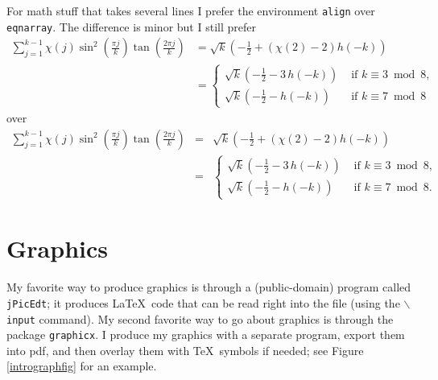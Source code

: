 \documentclass{article}
\begin{document}
{For math stuff that takes several lines I prefer the environment {\tt align} over {\tt eqnarray}. The difference is minor but I still prefer
\begin{align*}
  \sum_{ j=1 }^{ k-1 } \chi(j) \sin^2 \left( \frac{ \pi j }{ k } \right) \tan \left( \frac{ 2 \pi j }{ k } \right)
  &= \sqrt k \left( - \frac 1 2 + \left( \chi(2) - 2 \right) h(-k) \right) \\
  &= \begin{cases}
      \sqrt k \left( - \frac 1 2 - 3 \, h(-k) \right) & \text{ if } k \equiv 3 \bmod 8 , \\
      \sqrt k \left( - \frac 1 2 - h(-k) \right) & \text{ if } k \equiv 7 \bmod 8
    \end{cases}
\end{align*}
over
\begin{eqnarray*}
  \sum_{ j=1 }^{ k-1 } \chi(j) \sin^2 \left( \frac{ \pi j }{ k } \right) \tan \left( \frac{ 2 \pi j }{ k } \right)
  &=& \sqrt k \left( - \frac 1 2 + \left( \chi(2) - 2 \right) h(-k) \right) \\
  &=& \begin{cases}
      \sqrt k \left( - \frac 1 2 - 3 \, h(-k) \right) & \text{ if } k \equiv 3 \bmod 8 , \\
      \sqrt k \left( - \frac 1 2 - h(-k) \right) & \text{ if } k \equiv 7 \bmod 8 .
    \end{cases}
\end{eqnarray*}


\section{Graphics}

My favorite way to produce graphics is through a (public-domain) program called {\tt jPicEdt}; it produces \LaTeX\
code that can be read right into the file (using the {\tt $\backslash$input} command).
My second favorite way to go about graphics is through the package {\tt graphicx}. I produce my graphics with a separate program, export them into pdf, and then overlay them
with \TeX\ symbols if needed; see Figure \ref{intrographfig} for an example.

}
\end{document}
